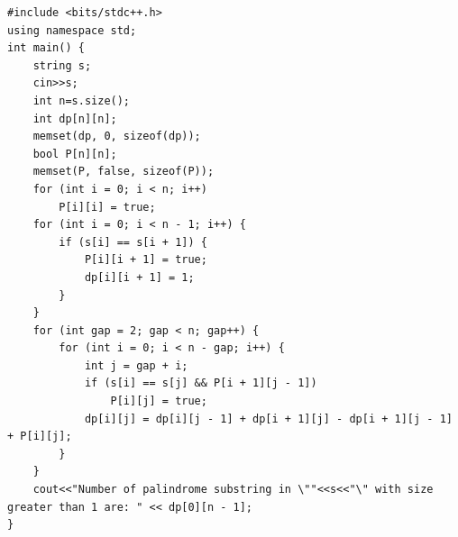 \documentclass[10pt]{article}
\begin{document}
\begin{lstlisting}
#include <bits/stdc++.h>
using namespace std;
int main() {
    string s;
    cin>>s;
    int n=s.size();
    int dp[n][n];
    memset(dp, 0, sizeof(dp));
    bool P[n][n];
    memset(P, false, sizeof(P));
    for (int i = 0; i < n; i++)
        P[i][i] = true;
    for (int i = 0; i < n - 1; i++) {
        if (s[i] == s[i + 1]) {
            P[i][i + 1] = true;
            dp[i][i + 1] = 1;
        }
    }
    for (int gap = 2; gap < n; gap++) {
        for (int i = 0; i < n - gap; i++) {
            int j = gap + i;
            if (s[i] == s[j] && P[i + 1][j - 1])
                P[i][j] = true;
            dp[i][j] = dp[i][j - 1] + dp[i + 1][j] - dp[i + 1][j - 1] + P[i][j];
        }
    }
    cout<<"Number of palindrome substring in \""<<s<<"\" with size greater than 1 are: " << dp[0][n - 1];
}
\end{lstlisting}
\clearpage

	
\end{document}
